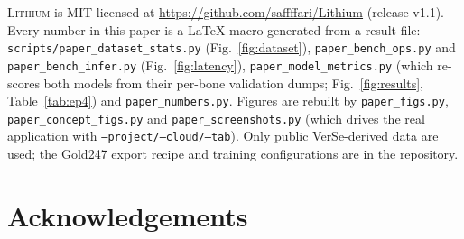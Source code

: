 \documentclass[11pt]{article}
\newcommand{\lithium}{\textsc{Lithium}}
\newcommand{\gold}{Gold247}
\begin{document}
{\sloppy
\lithium{} is MIT-licensed at \url{https://github.com/saffffari/Lithium}
(release v1.1). Every number in this paper is a LaTeX macro generated from a
result file: \texttt{scripts/paper\_dataset\_stats.py} (Fig.~\ref{fig:dataset}),
\texttt{paper\_bench\_ops.py} and \texttt{paper\_bench\_infer.py}
(Fig.~\ref{fig:latency}), \texttt{paper\_model\_metrics.py} (which re-scores
both models from their per-bone validation dumps; Fig.~\ref{fig:results},
Table~\ref{tab:ep4}) and \texttt{paper\_numbers.py}. Figures are rebuilt by
\texttt{paper\_figs.py}, \texttt{paper\_concept\_figs.py} and
\texttt{paper\_screenshots.py} (which drives the real application with
\texttt{--project/--cloud/--tab}). Only public VerSe-derived data are used; the
\gold{} export recipe and training configurations are in the repository.\par}

\section*{Acknowledgements}



\end{document}
